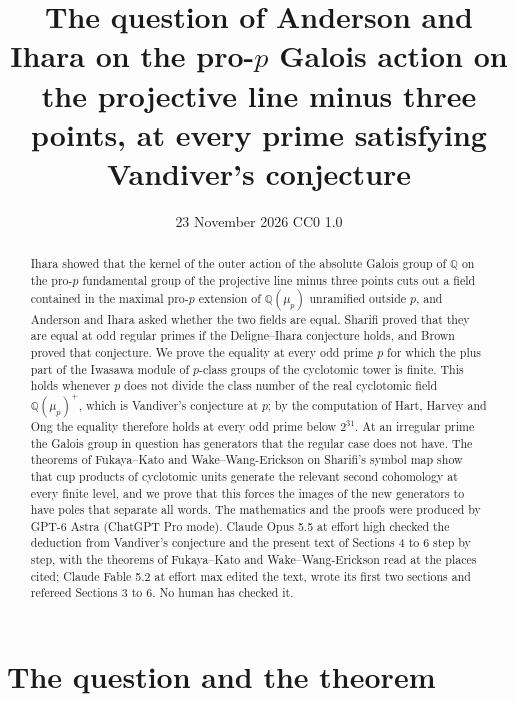 \documentclass[11pt]{article}
\title{The question of Anderson and Ihara on the pro-$p$ Galois action on the projective line minus three
points, at every prime satisfying Vandiver's conjecture}
\author{}
\date{23 November 2026 \quad CC0 1.0}
\theoremstyle{definition}
\numberwithin{equation}{section}
\begin{document}
\maketitle
\begin{abstract}
\noindent
Ihara showed that the kernel of the outer action of the absolute Galois group of $\mathbb Q$ on the pro-$p$
fundamental group of the projective line minus three points cuts out a field contained in the maximal pro-$p$
extension of $\mathbb Q(\mu_p)$ unramified outside $p$, and Anderson and Ihara asked whether the two fields are
equal. Sharifi proved that they are equal at odd regular primes if the Deligne--Ihara conjecture holds, and Brown
proved that conjecture. We prove the equality at every odd prime $p$ for which the plus part of the Iwasawa module
of $p$-class groups of the cyclotomic tower is finite. This holds whenever $p$ does not divide the class number of
the real cyclotomic field $\mathbb Q(\mu_p)^+$, which is Vandiver's conjecture at $p$; by the computation of Hart,
Harvey and Ong the equality therefore holds at every odd prime below $2^{31}$. At an irregular prime the Galois
group in question has generators that the regular case does not have. The theorems of Fukaya--Kato and
Wake--Wang-Erickson on Sharifi's symbol map show that cup products of cyclotomic units generate the relevant
second cohomology at every finite level, and we prove that this forces the images of the new generators to have
poles that separate all words. The mathematics and the proofs were produced by GPT-6 Astra (ChatGPT Pro mode).
Claude Opus 5.5 at effort high checked the deduction from Vandiver's conjecture and the present text of Sections 4
to 6 step by step, with the theorems of Fukaya--Kato and Wake--Wang-Erickson read at the places cited; Claude Fable
5.2 at effort max edited the text, wrote its first two sections and refereed Sections 3 to 6. No human has
checked it.
\end{abstract}

\section{The question and the theorem}
\end{document}
